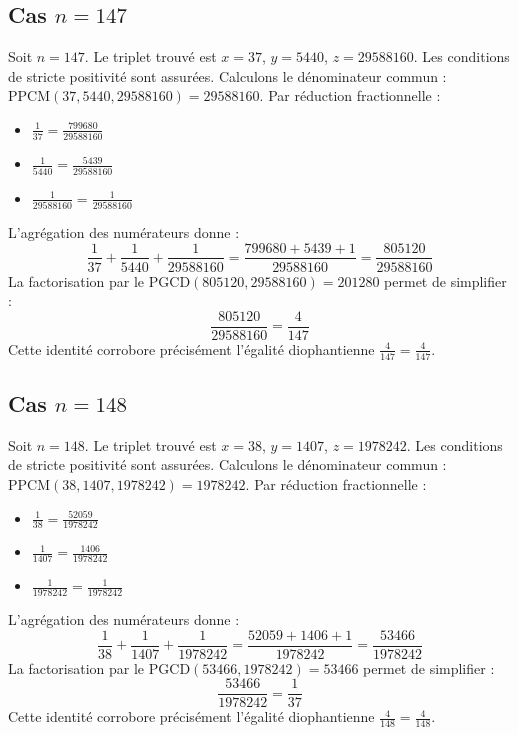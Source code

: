\documentclass[11pt,a4paper]{article}
\begin{document}
\subsection{Cas $n = 147$}
Soit $n = 147$. Le triplet trouvé est $x = 37$, $y = 5440$, $z = 29588160$.
Les conditions de stricte positivité sont assurées.
Calculons le dénominateur commun : $\text{PPCM}(37, 5440, 29588160) = 29588160$.
Par réduction fractionnelle :
\begin{itemize}
    \item $\frac{1}{37} = \frac{799680}{29588160}$
    \item $\frac{1}{5440} = \frac{5439}{29588160}$
    \item $\frac{1}{29588160} = \frac{1}{29588160}$
\end{itemize}
L'agrégation des numérateurs donne :
$$ \frac{1}{37} + \frac{1}{5440} + \frac{1}{29588160} = \frac{799680 + 5439 + 1}{29588160} = \frac{805120}{29588160} $$
La factorisation par le $\text{PGCD}(805120, 29588160) = 201280$ permet de simplifier :
$$ \frac{805120}{29588160} = \frac{4}{147} $$
Cette identité corrobore précisément l'égalité diophantienne $\frac{4}{147} = \frac{4}{147}$.

\subsection{Cas $n = 148$}
Soit $n = 148$. Le triplet trouvé est $x = 38$, $y = 1407$, $z = 1978242$.
Les conditions de stricte positivité sont assurées.
Calculons le dénominateur commun : $\text{PPCM}(38, 1407, 1978242) = 1978242$.
Par réduction fractionnelle :
\begin{itemize}
    \item $\frac{1}{38} = \frac{52059}{1978242}$
    \item $\frac{1}{1407} = \frac{1406}{1978242}$
    \item $\frac{1}{1978242} = \frac{1}{1978242}$
\end{itemize}
L'agrégation des numérateurs donne :
$$ \frac{1}{38} + \frac{1}{1407} + \frac{1}{1978242} = \frac{52059 + 1406 + 1}{1978242} = \frac{53466}{1978242} $$
La factorisation par le $\text{PGCD}(53466, 1978242) = 53466$ permet de simplifier :
$$ \frac{53466}{1978242} = \frac{1}{37} $$
Cette identité corrobore précisément l'égalité diophantienne $\frac{4}{148} = \frac{4}{148}$.
\end{document}
